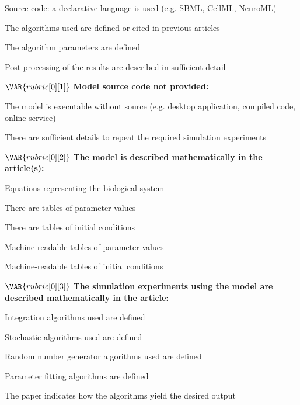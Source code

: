 \documentclass{article}
\newcommand{\absent}{\raisebox{0pt}{\tikz{\node[draw,scale=0.7,regular polygon, regular polygon sides=4,fill=none](){};}}}
\newcommand{\present}{\raisebox{0pt}{\tikz{\node[draw,scale=0.7,regular polygon, regular polygon sides=4,fill=black!20!Cerulean](){};}}}
\begin{document}
\begin{tcolorbox}
\begin{todolist}
  \item[\present] Source code: a declarative language is used (e.g. SBML, CellML, NeuroML)
  \begin{todolist}
    \item[\absent] The algorithms used are defined or cited in previous articles
    \item[\absent] The algorithm parameters are defined
    \item[\absent] Post-processing of the results are described in sufficient detail
  \end{todolist}
\end{todolist}
$\VAR{rubric[0][1]}$ \textbf{Model source code not provided:}
\begin{todolist}
    \item[\absent] The model is executable without source (e.g. desktop application, compiled code, online service)
    \begin{todolist}
        \item[\absent] There are sufficient details to repeat the required simulation experiments
    \end{todolist}
\end{todolist}
$\VAR{rubric[0][2]}$ \textbf{The model is described mathematically in the article(s):}
\begin{todolist}
    \item[\present] Equations representing the biological system
    \item[\absent] There are tables of parameter values
    \item[\absent] There are tables of initial conditions
    \item Machine-readable tables of parameter values
    \item Machine-readable tables of initial conditions
\end{todolist}
$\VAR{rubric[0][3]}$ \textbf{The simulation experiments using the model are described mathematically in the article:}
\begin{todolist}
    \item[\absent] Integration algorithms used are defined
    \item[\absent] Stochastic algorithms used are defined
    \item[\absent] Random number generator algorithms used are defined
    \item Parameter fitting algorithms are defined
    \item The paper indicates how the algorithms yield the desired output
\end{todolist}
\end{tcolorbox}
\end{document}

